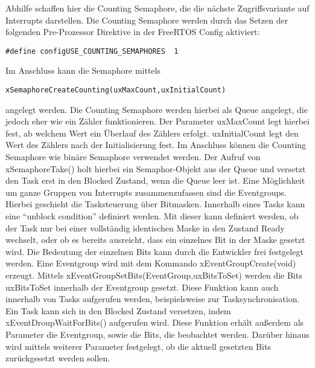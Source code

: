 \newline Abhilfe schaffen hier die Counting Semaphore, die die nächste Zugriffsvariante auf Interrupts darstellen. Die Counting Semaphore werden durch das Setzen der folgenden Pre-Prozessor Direktive in der FreeRTOS Config aktiviert:
\begin{lstlisting}[numbers = none]
#define configUSE_COUNTING_SEMAPHORES  1
\end{lstlisting}
Im Anschluss kann die Semaphore mittels
\begin{lstlisting}[numbers = none]
xSemaphoreCreateCounting(uxMaxCount,uxInitialCount) 
\end{lstlisting}
angelegt werden. Die Counting Semaphore werden hierbei als Queue angelegt, die jedoch eher wie ein Zähler funktionieren. Der Parameter uxMaxCount legt hierbei fest, ab welchem Wert ein Überlauf des Zählers erfolgt. uxInitialCount legt den Wert des Zählers nach der Initialisierung fest. Im Anschluss können die Counting Semaphore wie binäre Semaphore verwendet werden. Der Aufruf von xSemaphoreTake() holt hierbei ein Semaphor-Objekt aus der Queue und versetzt den Task erst in den Blocked Zustand, wenn die Queue leer ist.
Eine Möglichkeit um ganze Gruppen von Interrupts zusammenzufassen sind die Eventgroups. Hierbei geschieht die Tasksteuerung über Bitmasken. Innerhalb eines Tasks kann eine "`unblock condition"' definiert werden. Mit dieser kann definiert werden, ob der Task nur bei einer vollständig identischen Maske in den Zustand Ready wechselt, oder ob es bereits ausreicht, dass ein einzelnes Bit in der Maske gesetzt wird. Die Bedeutung der einzelnen Bits kann durch die Entwickler frei festgelegt werden. Eine Eventgroup wird mit dem Kommando xEventGroupCreate(void) erzeugt. Mittels xEventGroupSetBits(EventGroup,uxBitsToSet) werden die Bits uxBitsToSet innerhalb der Eventgroup gesetzt. Diese Funktion kann auch innerhalb von Tasks aufgerufen werden, beispielsweise zur Tasksynchronisation. Ein Task kann sich in den Blocked Zustand versetzen, indem xEventDroupWaitForBits() aufgerufen wird. Diese Funktion erhält außerdem als Parameter die Eventgroup, sowie die Bits, die beobachtet werden. Darüber hinaus wird mittels weiterer Parameter festgelegt, ob die aktuell gesetzten Bits zurückgesetzt werden sollen.
